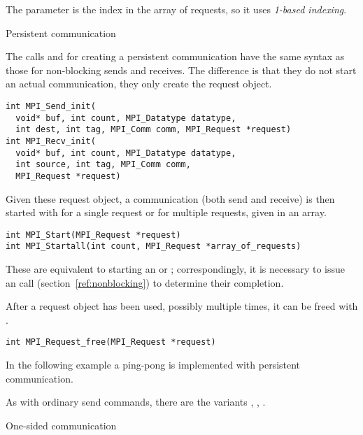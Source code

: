 \begin{fortrannote}
  The  parameter is the index in the array of requests,
  so it uses \emph{1-based indexing}.
\end{fortrannote}

 {Persistent communication}

The calls  and 
for creating a persistent communication have the same syntax as 
those for non-blocking sends and receives. The difference is that they do not start
an actual communication, they only create the request object.
\begin{verbatim}
int MPI_Send_init(
  void* buf, int count, MPI_Datatype datatype, 
  int dest, int tag, MPI_Comm comm, MPI_Request *request) 
int MPI_Recv_init(
  void* buf, int count, MPI_Datatype datatype, 
  int source, int tag, MPI_Comm comm, 
  MPI_Request *request)
\end{verbatim}

Given these request object, a communication (both send and receive) is then started
with  for a single request or  for 
multiple requests, given in an array.
\begin{verbatim}
int MPI_Start(MPI_Request *request)
int MPI_Startall(int count, MPI_Request *array_of_requests) 
\end{verbatim}
These are equivalent to starting an  or ; correspondingly, 
it is necessary to issue an  call (section~\ref{ref:nonblocking})
to determine their completion.

After a request object has been used, possibly multiple times, it can be freed
with .
\begin{verbatim}
int MPI_Request_free(MPI_Request *request)
\end{verbatim}

In the following example a ping-pong is implemented with persistent communication.

As with ordinary send commands, there are the variants
,
,
.


 {One-sided communication}

